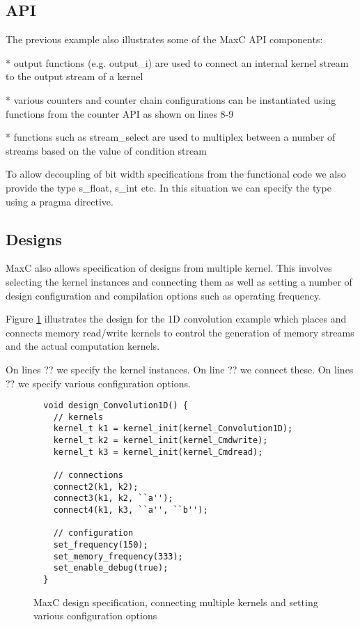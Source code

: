 \subsection{API}
The previous example also illustrates some of the MaxC API components:

* output functions (e.g. output\_i) are used to connect an internal
kernel stream to the output stream of a kernel

* various counters and counter chain configurations can be
instantiated using functions from the counter API as shown on lines
8-9

* functions such as stream\_select are used to multiplex between a
number of streams based on the value of condition stream


To allow decoupling of bit width specifications from the functional
code we also provide the type s\_float, s\_int etc. In this
situation we can specify the type using a pragma directive.

\subsection{Designs}




MaxC also allows specification of designs from multiple kernel. This
involves selecting the kernel instances and connecting them as well as
setting a number of design configuration and compilation options such
as operating frequency.

Figure \ref{lst:maxc-design} illustrates the design for the 1D
convolution example which places and connects memory read/write
kernels to control the generation of memory streams and the actual
computation kernels.

On lines ?? we specify the kernel instances. On line ?? we connect
these. On lines ?? we specify various configuration options.

\begin{figure}
\centering
\begin{lstlisting}
  void design_Convolution1D() {
    // kernels
    kernel_t k1 = kernel_init(kernel_Convolution1D);
    kernel_t k2 = kernel_init(kernel_Cmdwrite);
    kernel_t k3 = kernel_init(kernel_Cmdread);

    // connections
    connect2(k1, k2);
    connect3(k1, k2, ``a'');
    connect4(k1, k3, ``a'', ``b'');

    // configuration
    set_frequency(150);
    set_memory_frequency(333);
    set_enable_debug(true);
  }
\end{lstlisting}
\caption{MaxC design specification, connecting multiple kernels and
  setting various configuration options}
\label{lst:maxc-design}
\end{figure}

